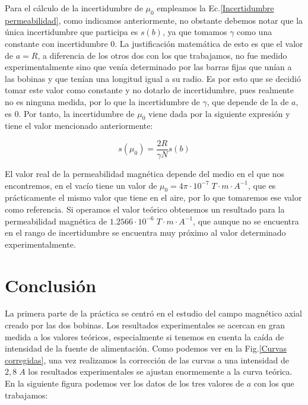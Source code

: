 \documentclass[a4paper,12pt,titlepage]{report}
\begin{document}
Para el cálculo de la incertidumbre de $\mu_0$ empleamos la Ec.\ref{Incertidumbre permeabilidad}, como indicamos anteriormente, no obstante debemos notar que la única incertidumbre que participa es $s(b)$, ya que tomamos $\gamma$ como una constante con incertidumbre 0. La justificación matemática de esto es que el valor de $a=R$, a diferencia de los otros dos con los que trabajamos, no fue medido experimentalmente sino que venía determinado por las barras fijas que unían a las bobinas y que tenían una longitud igual a su radio. Es por esto que se decidió tomar este valor como constante y no dotarlo de incertidumbre, pues realmente no es ninguna medida, por lo que la incertidumbre de $\gamma$, que depende de la de $a$, es 0. Por tanto, la incertidumbre de $\mu_0$ viene dada por la siguiente expresión y tiene el valor mencionado anteriormente:

\begin{equation}
    s(\mu_0) = \frac{2R}{\gamma N} s(b)
\end{equation}

\newpage

El valor real de la permeabilidad magnética depende del medio en el que nos encontremos, en el vacío tiene un valor de $\mu_0=4\pi\cdot 10^{-7} \; T \cdot m \cdot A^{-1}$, que es prácticamente el mismo valor que tiene en el aire, por lo que tomaremos ese valor como referencia. Si operamos el valor teórico obtenemos un resultado para la permeabilidad magnética de $1.2566 \cdot 10^{-6}\; T \cdot m \cdot A^{-1}$, que aunque no se encuentra en el rango de incertidumbre se encuentra muy próximo al valor determinado experimentalmente.

\newpage

\section{Conclusión}

La primera parte de la práctica se centró en el estudio del campo magnético axial creado por las dos bobinas. Los resultados experimentales se acercan en gran medida a los valores teóricos, especialmente si tenemos en cuenta la caída de intensidad de la fuente de alimentación. Como podemos ver en la Fig.\ref{Curvas corregidas}, una vez realizamos la corrección de las curvas a una intensidad de $2,8 \;A$ los resultados experimentales se ajustan enormemente a la curva teórica. En la siguiente figura podemos ver los datos de los tres valores de $a$ con los que trabajamos:
\end{document}
